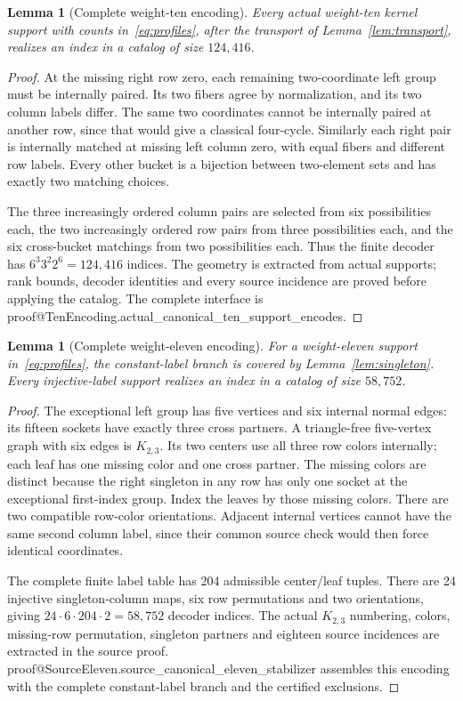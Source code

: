 \documentclass[11pt]{article}
\makeatletter
\newtheorem{lemma}[theorem]{Lemma}
\theoremstyle{definition}\newtheorem{definition}[theorem]{Definition}
\newcommand{\lean}[2]{\csname proof@#1.#2\endcsname}
\makeatother
\begin{document}
\begin{lemma}[Complete weight-ten encoding]\label{lem:ten}
Every actual weight-ten kernel support with counts in~\eqref{eq:profiles},
after the transport of Lemma~\ref{lem:transport}, realizes an index in a
catalog of size $124,416$.
\end{lemma}
\begin{proof}
At the missing right row zero, each remaining two-coordinate left group
must be internally paired. Its two fibers agree by normalization, and its
two column labels differ. The same two coordinates cannot be internally
paired at another row, since that would give a classical four-cycle.
Similarly each right pair is internally matched at missing left column zero,
with equal fibers and different row labels. Every other bucket is a
bijection between two-element sets and has exactly two matching choices.

The three increasingly ordered column pairs are selected from six possibilities each,
the two increasingly ordered row pairs from three possibilities each, and the six
cross-bucket matchings from two possibilities each. Thus the finite decoder
has $6^3 3^2 2^6=124,416$ indices. The geometry is extracted from actual
supports; rank bounds, decoder identities and every source incidence are
proved before applying the catalog. The complete interface is
\lean{TenEncoding}{actual_canonical_ten_support_encodes}.
\end{proof}

\begin{lemma}[Complete weight-eleven encoding]\label{lem:eleven}
For a weight-eleven support in~\eqref{eq:profiles}, the constant-label branch
is covered by Lemma~\ref{lem:singleton}. Every injective-label support realizes
an index in a catalog of size $58,752$.
\end{lemma}
\begin{proof}
The exceptional left group has five vertices and six internal normal edges:
its fifteen sockets have exactly three cross partners. A triangle-free
five-vertex graph with six edges is $K_{2,3}$. Its two centers use all three
row colors internally; each leaf has one missing color and one cross partner.
The missing colors are distinct because the right singleton in any row has
only one socket at the exceptional first-index group. Index the leaves by
those missing colors. There are two compatible row-color orientations.
Adjacent internal vertices cannot have the same second column label, since
their common source check would then force identical coordinates.

The complete finite label table has 204 admissible center/leaf tuples.
There are 24 injective singleton-column maps, six row permutations and two
orientations, giving $24\cdot6\cdot204\cdot2=58,752$ decoder indices.
The actual $K_{2,3}$ numbering, colors, missing-row permutation, singleton
partners and eighteen source incidences are extracted in the source proof.
\lean{SourceEleven}{source_canonical_eleven_stabilizer} assembles this encoding
with the complete constant-label branch and the certified exclusions.
\end{proof}
\end{document}

